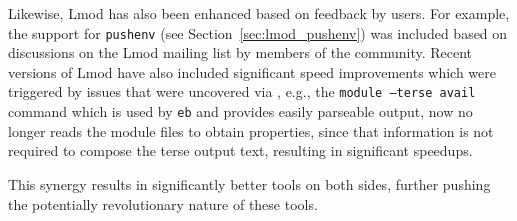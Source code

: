 Likewise, Lmod has also been enhanced based on feedback by \easybuild{} users.
For example, the support for \texttt{pushenv} (see
Section~\ref{sec:lmod_pushenv}) was included based on discussions on the Lmod
mailing list by members of the \easybuild{} community. Recent versions of Lmod
have also included significant speed improvements which were triggered by issues
that were uncovered via \easybuild{}, e.g., the \texttt{module --terse avail}
command which is used by \texttt{eb} and provides easily parseable output, now no
longer reads the module files to obtain properties, since that information is not
required to compose the terse output text, resulting in significant speedups.

This synergy results in significantly better tools on both sides, further
pushing the potentially revolutionary nature of these tools.

